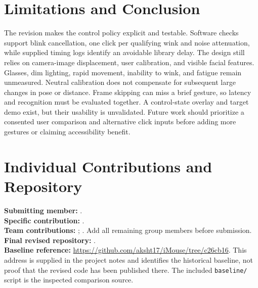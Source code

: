 \documentclass[10pt,twocolumn,letterpaper]{article}
\begin{document}
\section{Limitations and Conclusion}
The revision makes the control policy explicit and testable. Software checks support blink cancellation, one click per qualifying wink and noise attenuation, while supplied timing logs identify an avoidable library delay. The design still relies on camera-image displacement, user calibration, and visible facial features. Glasses, dim lighting, rapid movement, inability to wink, and fatigue remain unmeasured. Neutral calibration does not compensate for subsequent large changes in pose or distance. Frame skipping can miss a brief gesture, so latency and recognition must be evaluated together. A control-state overlay and target demo exist, but their usability is unvalidated. Future work should prioritize a consented user comparison and alternative click inputs before adding more gestures or claiming accessibility benefit.

\section*{Individual Contributions and Repository}
\textbf{Submitting member:} \SubmittingMember.\\
\textbf{Specific contribution:} \PersonalContribution.\\
\textbf{Team contributions:} \MemberOneContribution; \MemberTwoContribution. Add all remaining group members before submission.\\
\textbf{Final revised repository:} \FinalRepo.\\
\textbf{Baseline reference:} \url{https://github.com/aksht17/iMouse/tree/c26cb16}. This address is supplied in the project notes and identifies the historical baseline, not proof that the revised code has been published there. The included \texttt{baseline/} script is the inspected comparison source.
\end{document}
